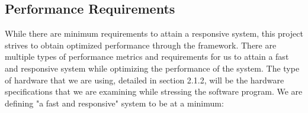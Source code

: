 \documentclass[letterpaper,10pt,titlepage,draftclsnofoot,onecolumn,compsoc,utf8,latin1]{IEEEtran}
\begin{document}
\begin{singlespace}
\subsection{Performance Requirements}
\begin{singlespace}
\noindent
While there are minimum requirements to attain a responsive system, this project strives to obtain optimized performance through the framework. There are multiple types of performance metrics and requirements for us to attain a fast and responsive system while optimizing the performance of the system. The type of hardware that we are using, detailed in section 2.1.2, will be the hardware specifications that we are examining while stressing the software program. We are defining "a fast and responsive" system to be at a minimum: \\


\end{singlespace}
\end{singlespace}
\end{document}
